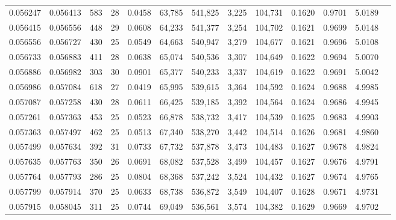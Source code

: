 \begin{tabular}{rrrrrrrrrrrrr}
0.056247 & 0.056413 & 583 &  28 &                                     0.0458 &  63,785 & 541,825 &   3,225 & 104,731 & 0.1620 & 0.9701 & 5.0189 \\
0.056415 & 0.056556 & 448 &  29 &                                     0.0608 &  64,233 & 541,377 &   3,254 & 104,702 & 0.1621 & 0.9699 & 5.0148 \\
0.056556 & 0.056727 & 430 &  25 &                                     0.0549 &  64,663 & 540,947 &   3,279 & 104,677 & 0.1621 & 0.9696 & 5.0108 \\
0.056733 & 0.056883 & 411 &  28 &                                     0.0638 &  65,074 & 540,536 &   3,307 & 104,649 & 0.1622 & 0.9694 & 5.0070 \\
0.056886 & 0.056982 & 303 &  30 &                                     0.0901 &  65,377 & 540,233 &   3,337 & 104,619 & 0.1622 & 0.9691 & 5.0042 \\
0.056986 & 0.057084 & 618 &  27 &                                     0.0419 &  65,995 & 539,615 &   3,364 & 104,592 & 0.1624 & 0.9688 & 4.9985 \\
0.057087 & 0.057258 & 430 &  28 &                                     0.0611 &  66,425 & 539,185 &   3,392 & 104,564 & 0.1624 & 0.9686 & 4.9945 \\
0.057261 & 0.057363 & 453 &  25 &                                     0.0523 &  66,878 & 538,732 &   3,417 & 104,539 & 0.1625 & 0.9683 & 4.9903 \\
0.057363 & 0.057497 & 462 &  25 &                                     0.0513 &  67,340 & 538,270 &   3,442 & 104,514 & 0.1626 & 0.9681 & 4.9860 \\
0.057499 & 0.057634 & 392 &  31 &                                     0.0733 &  67,732 & 537,878 &   3,473 & 104,483 & 0.1627 & 0.9678 & 4.9824 \\
0.057635 & 0.057763 & 350 &  26 &                                     0.0691 &  68,082 & 537,528 &   3,499 & 104,457 & 0.1627 & 0.9676 & 4.9791 \\
0.057764 & 0.057793 & 286 &  25 &                                     0.0804 &  68,368 & 537,242 &   3,524 & 104,432 & 0.1627 & 0.9674 & 4.9765 \\
0.057799 & 0.057914 & 370 &  25 &                                     0.0633 &  68,738 & 536,872 &   3,549 & 104,407 & 0.1628 & 0.9671 & 4.9731 \\
0.057915 & 0.058045 & 311 &  25 &                                     0.0744 &  69,049 & 536,561 &   3,574 & 104,382 & 0.1629 & 0.9669 & 4.9702 \\

\end{tabular}
